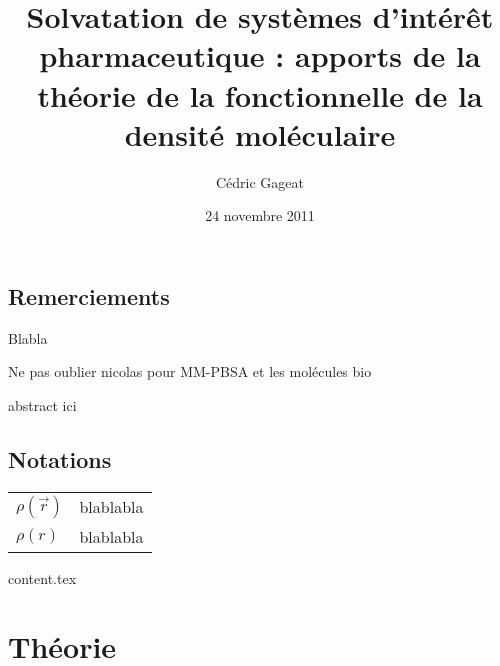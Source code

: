 \documentclass{bredele}
\title{Solvatation de systèmes d’intérêt pharmaceutique : apports de la théorie de la fonctionnelle de la densité moléculaire}
\author{Cédric Gageat}
\date{24 novembre 2011}
\begin{document}

%


\tikzexternaldisable
\maketitle
\tikzexternalenable

\cleardoublepage
	
\frontmatter
\chapter*{Remerciements}
Blabla

Ne pas oublier nicolas pour MM-PBSA et les molécules bio

\clearpage

abstract ici

\clearemptydoublepage



\renewcommand\contentsname{Sommaire}
\tableofcontents
 
 
\renewcommand{\cftdotsep}{\cftnodots}
\clearpage \newpage
\listoffigures
\clearpage \newpage
\listoftables


\clearemptydoublepage
\chapter*{Notations}
\thispagestyle{empty}
\begin{tabular}{ll}
$\rho(\vec{r})$ & blablabla \\
$\rho(r)$ & blablabla 
\end{tabular}




\clearemptydoublepage
\mainmatter


\clearemptydoublepage
{content.tex}

\part{Théorie}
\end{document}
